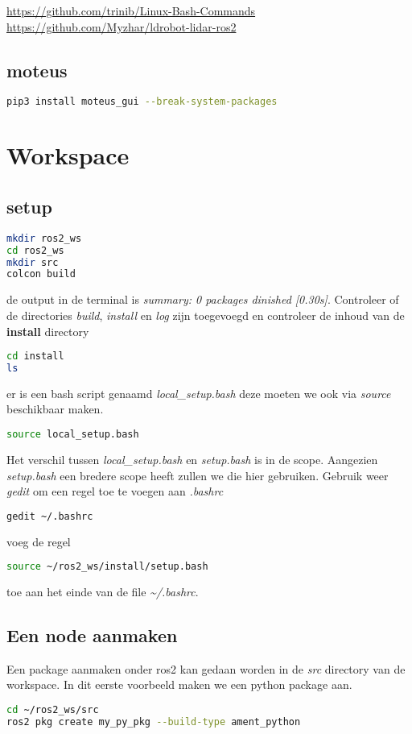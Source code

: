 \documentclass[12pt,a4paper]{exam}
\begin{document}
{\small \url{https://github.com/trinib/Linux-Bash-Commands}}\\
{\small \url{https://github.com/Myzhar/ldrobot-lidar-ros2}}

\subsection{moteus}

\begin{lstlisting}[language=bash]
pip3 install moteus_gui --break-system-packages
\end{lstlisting}



\section{Workspace}
\subsection{setup}
\begin{lstlisting}[language=bash]
mkdir ros2_ws
cd ros2_ws
mkdir src
colcon build
\end{lstlisting}
de output in de terminal is \textit{summary: 0 packages dinished [0.30s]}. Controleer of de directories \textit{build}, \textit{install} en \textit{log} zijn toegevoegd en controleer de inhoud van de \textbf{install} directory 
\begin{lstlisting}[language=bash]
cd install
ls
\end{lstlisting}
er is een bash script genaamd \textit{local\_setup.bash} deze moeten we ook via \textit{source} beschikbaar maken.
\begin{lstlisting}[language=bash]
source local_setup.bash
\end{lstlisting}
Het verschil tussen \textit{local\_setup.bash} en \textit{setup.bash} is in de scope. Aangezien \textit{setup.bash}  een bredere scope heeft zullen we die hier gebruiken. Gebruik weer \textit{gedit} om een regel toe te voegen aan \textit{.bashrc}
\begin{lstlisting}[language=bash]
gedit ~/.bashrc
\end{lstlisting}
voeg de regel
\begin{lstlisting}[language=bash]
source ~/ros2_ws/install/setup.bash
\end{lstlisting}
toe aan het einde van de file \textit{\textasciitilde/.bashrc}.
\subsection{Een node aanmaken}
Een package aanmaken onder ros2 kan gedaan worden in de \textit{src} directory van de workspace. In dit eerste voorbeeld maken we een python package aan.
\begin{lstlisting}[language=bash]
cd ~/ros2_ws/src
ros2 pkg create my_py_pkg --build-type ament_python
\end{lstlisting}
\end{document}
